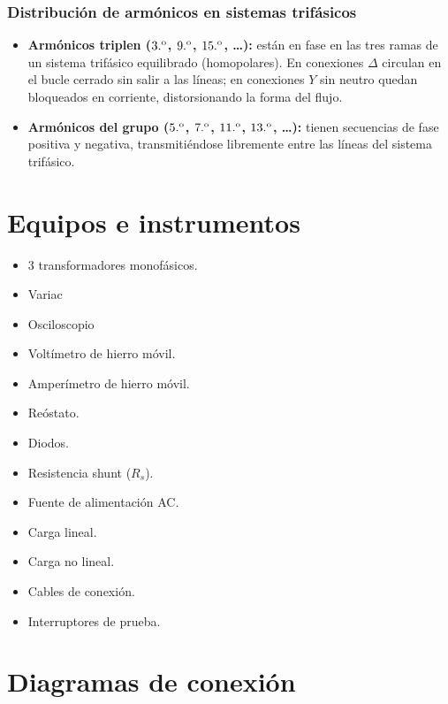 \documentclass[12pt]{article}
\begin{document}
\subsubsection{Distribuci\'on de arm\'onicos en sistemas trif\'asicos}
\begin{itemize}
    \item \textbf{Arm\'onicos triplen ($3.\textsuperscript{o}$, $9.\textsuperscript{o}$, $15.\textsuperscript{o}$, \ldots):} est\'an en fase en las tres ramas de un sistema trif\'asico equilibrado (homopolares). En conexiones $\Delta$ circulan en el bucle cerrado sin salir a las l\'ineas; en conexiones $Y$ sin neutro quedan bloqueados en corriente, distorsionando la forma del flujo.
    \item \textbf{Arm\'onicos del grupo ($5.\textsuperscript{o}$, $7.\textsuperscript{o}$, $11.\textsuperscript{o}$, $13.\textsuperscript{o}$, \ldots):} tienen secuencias de fase positiva y negativa, transmiti\'endose libremente entre las l\'ineas del sistema trif\'asico.
\end{itemize}

\newpage
\section{Equipos e instrumentos}
\begin{itemize}
    \item 3 transformadores monof\'asicos.
    \item Variac
    \item Osciloscopio
    \item Volt\'imetro de hierro m\'ovil.
    \item Amper\'imetro de hierro m\'ovil.
    \item Re\'ostato.
    \item Diodos.
    \item Resistencia shunt ($R_s$).
    \item Fuente de alimentaci\'on AC.
    \item Carga lineal.
    \item Carga no lineal.
    \item Cables de conexi\'on.
    \item Interruptores de prueba.
\end{itemize}

\newpage

\section{Diagramas de conexi\'on}
\end{document}
